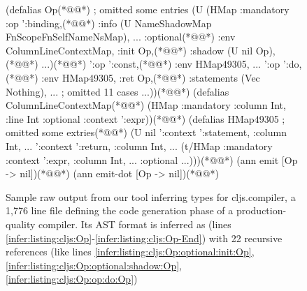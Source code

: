\begin{figure}
\begin{cljlistingnumbered}
  (defalias Op(*@\label{infer:listing:cljs:Op}@*) ; omitted some entries
    (U (HMap :mandatory
             {:op ':binding,(*@\label{infer:listing:cljs:Op:op:binding}@*)
              :info (U NameShadowMap
                       FnScopeFnSelfNameNsMap), ...}
             :optional(*@\label{infer:listing:cljs:Op:optional}@*)
             {:env ColumnLineContextMap, :init Op,(*@\label{infer:listing:cljs:Op:optional:init:Op}@*)
              :shadow (U nil Op),(*@\label{infer:listing:cljs:Op:optional:shadow:Op}@*) ...})(*@\label{infer:listing:cljs:Op:optionalEnd}@*)
      '{:op ':const,(*@\label{infer:listing:cljs:Op:op:const}@*) :env HMap49305, ...}
      '{:op ':do,(*@\label{infer:listing:cljs:Op:op:do}@*) :env HMap49305,
        :ret Op,(*@\label{infer:listing:cljs:Op:op:do:Op}@*) :statements (Vec Nothing), ...}
      ; omitted 11 cases
      ...))(*@\label{infer:listing:cljs:Op-End}@*)
  (defalias ColumnLineContextMap(*@\label{infer:listing:cljs:ColumnLineContextMap}@*)
    (HMap :mandatory {:column Int, :line Int}
          :optional {:context ':expr}))(*@\label{infer:listing:cljs:ColumnLineContextMapEnd}@*)
  (defalias HMap49305 ; omitted some extries(*@\label{infer:listing:cljs:HMap49305}@*)
    (U nil
       '{:context ':statement, :column Int, ...}
       '{:context ':return, :column Int, ...}
       (t/HMap :mandatory
               {:context ':expr, :column Int, ...}
               :optional {...})))(*@\label{infer:listing:cljs:HMap49305End}@*)
  (ann emit [Op -> nil])(*@\label{infer:listing:cljs:emit}@*)
  (ann emit-dot [Op -> nil])(*@\label{infer:listing:cljs:emit-dot}@*)
\end{cljlistingnumbered}
\caption{
         Sample raw output from our
         tool inferring types for cljs.compiler,
         a 1,776 line file defining the code generation phase of
         a production-quality compiler.
         Its AST format is inferred as  (lines \ref{infer:listing:cljs:Op}-\ref{infer:listing:cljs:Op-End})
         with 22 recursive references
         (like lines \ref{infer:listing:cljs:Op:optional:init:Op}, \ref{infer:listing:cljs:Op:optional:shadow:Op}, \ref{infer:listing:cljs:Op:op:do:Op})
}
\end{figure}
